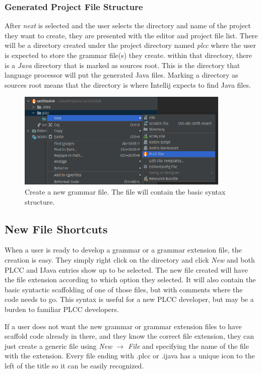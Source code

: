 \documentclass[conference, letterpaper]{IEEEtran}
\begin{document}
\subsubsection{Generated Project File Structure}\label{subsubsec:generated-project-file-structure}
After \textit{next} is selected and the user selects the directory and name of the project they want to create, they are presented with the editor and project file list.
There will be a directory created under the project directory named \textit{plcc} where the user is expected to store the grammar file(s) they create.
within that directory, there is a \textit{Java} directory that is marked as sources root.
This is the directory that language processor will put the generated Java files.
Marking a directory as sources root means that the directory is where Intellij expects to find Java files.

\begin{figure}[!t]
    \centering
    \includegraphics[width=4in]{new_PLCC_file_shortcut.png}
    \caption{Create a new grammar file. The file will contain the basic syntax structure.}
    \label{fig:new_file_shortcut}
\end{figure}
\subsection{New File Shortcuts}\label{subsec:new-plcc-file-shortcut}
When a user is ready to develop a grammar or a grammar extension file, the creation is easy.
They simply right click on the directory and click \textit{New} and both PLCC and IJava entries show up to be selected.
The new file created will have the file extension according to which option they selected.
It will also contain the basic syntactic scaffolding of one of those files, but with comments where the code needs to go.
This syntax is useful for a new PLCC developer, but may be a burden to familiar PLCC developers.

If a user does not want the new grammar or grammar extension files to have scaffold code already in there, and they know the correct file extension, they can just create a generic file using \textit{New $\rightarrow$ File} and specifying the name of the file with the extension.
Every file ending with .plcc or .ijava has a unique icon to the left of the title so it can be easily recognized.
\end{document}
